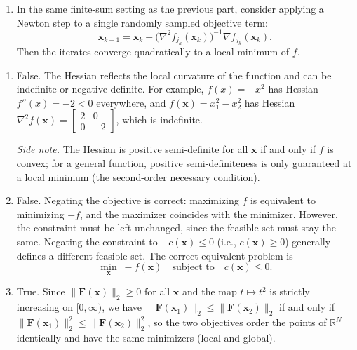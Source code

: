 \begin{exercise}
\begin{enumerate}[label=(\alph*)]
        \[
            \mathbf{x}_{k+1} = \mathbf{x}_k - \alpha_k \nabla f_{j_k}(\mathbf{x}_k).
        \]
        Then the iterates converge linearly to a local minimum of $f$.
        \item  In the same finite-sum setting as the previous part, consider applying a Newton step to a single randomly sampled objective term:
        \[
            \mathbf{x}_{k+1} = \mathbf{x}_k - \big(\nabla^2 f_{j_k}(\mathbf{x}_k)\big)^{-1} \nabla f_{j_k}(\mathbf{x}_k).
        \]
        Then the iterates converge quadratically to a local minimum of $f$.
    \end{enumerate}
\end{exercise}

\begin{solution}
    \begin{enumerate}[label=(\alph*)]
        \item  False. The Hessian reflects the local curvature of the function and can be indefinite or negative definite. For example, $f(x) = -x^2$ has Hessian $f''(x) = -2 < 0$ everywhere, and $f(\mathbf{x}) = x_1^2 - x_2^2$ has Hessian $\nabla^2 f(\mathbf{x}) = \begin{bmatrix} 2 & 0 \\ 0 & -2 \end{bmatrix}$, which is indefinite.

        \emph{Side note.} The Hessian is positive semi-definite for all $\mathbf{x}$ if and only if $f$ is convex; for a general function, positive semi-definiteness is only guaranteed at a local minimum (the second-order necessary condition).
        \item  False. Negating the objective is correct: maximizing $f$ is equivalent to minimizing $-f$, and the maximizer coincides with the minimizer. However, the constraint must be left unchanged, since the feasible set must stay the same. Negating the constraint to $-c(\mathbf{x}) \le 0$ (i.e., $c(\mathbf{x}) \ge 0$) generally defines a different feasible set. The correct equivalent problem is
        \[
            \min_{\mathbf{x}} \; -f(\mathbf{x}) \quad \text{subject to} \quad c(\mathbf{x}) \le 0.
        \]
        \item  True. Since $\|\mathbf{F}(\mathbf{x})\|_2 \ge 0$ for all $\mathbf{x}$ and the map $t \mapsto t^2$ is strictly increasing on $[0, \infty)$, we have $\|\mathbf{F}(\mathbf{x}_1)\|_2 \le \|\mathbf{F}(\mathbf{x}_2)\|_2$ if and only if $\|\mathbf{F}(\mathbf{x}_1)\|_2^2 \le \|\mathbf{F}(\mathbf{x}_2)\|_2^2$, so the two objectives order the points of $\mathbb{R}^N$ identically and have the same minimizers (local and global).


\end{enumerate}
\end{solution}

